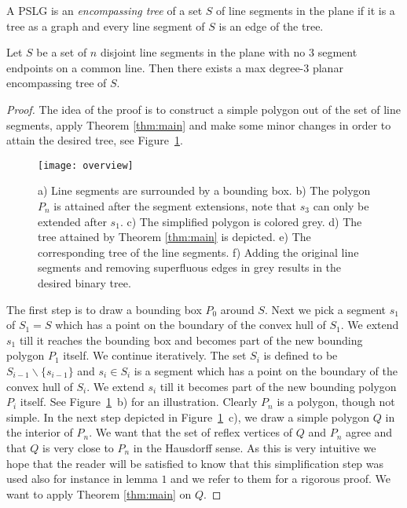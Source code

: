 \documentclass[12pt]{article}
\begin{document}
A PSLG is an \emph{encompassing tree} of a set $S$ of line segments in the plane if it is a tree as a graph and every line segment of $S$ is an edge of the tree.
\begin{theorem}
	Let $S$ be a set of $n$ disjoint line segments in the plane with no $3$ segment endpoints on a common line. Then there exists 
a max degree-$3$ planar encompassing tree of $S$. 
\end{theorem}
\begin{proof}
	The idea of the proof is to construct a simple polygon out of the set of line segments, apply Theorem \ref{thm:main} and make some minor changes in order to  attain the desired tree, see Figure~\ref{fig:overview}.
	\begin{figure}[h]
			\begin{center}
			\texttt{[image: overview]}
				\caption{a) Line segments are surrounded by a bounding box. b) The polygon $P_n$ is attained after the segment extensions, note that $s_3$ can only be extended after $s_1$. c) The simplified polygon is colored grey. d) The tree attained by Theorem \ref{thm:main} is depicted. 
				e) The corresponding tree of the line segments.
				 f) Adding the original line segments and removing superfluous edges in grey results in the desired binary tree.}
				\label{fig:overview}
			\end{center}
	\end{figure} 
	The first step is to draw a bounding box $P_0$ around $S$. Next we pick a segment $s_1$ of $S_1 = S$ which has a point on the boundary of the convex hull of $S_1$. We extend $s_1$ till it reaches the bounding box and becomes part of the new bounding polygon $P_1$ itself.
	We continue iteratively. The set $S_i$ is defined to be $S_{i-1} \backslash \{s_{i-1}\}$ and $s_i \in S_i$ is a segment which has a point on the boundary of the convex hull of $S_i$. We extend $s_i$ till it becomes part of the new bounding polygon $P_i$ itself. See Figure~\ref{fig:overview}~b) for an illustration.
Clearly $P_n$ is a polygon, though not simple. In the next step depicted in Figure~\ref{fig:overview}~c), we draw a simple polygon $Q$ in the interior of $P_n$. We want that the set of reflex vertices of $Q$ and $P_n$ agree and that $Q$ is very close to $P_n$ in the Hausdorff sense. As this is very intuitive we hope that the reader will be satisfied to know that
this simplification step was used also for instance in \cite{2012arXiv1207.2375A} lemma $1$ and we refer to them for a rigorous proof.
We want to apply Theorem \ref{thm:main} on $Q$.

\end{proof}
\end{document}
